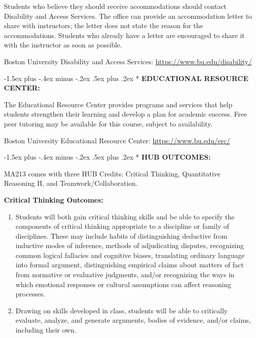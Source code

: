 \documentclass[11pt]{article}
\makeatletter
\renewcommand\section{\@startsection{section}{1}{0pt}%
  {-1.5ex plus -.4ex minus -.2ex}%
  {.5ex plus .2ex}%
  {\normalfont\Large\bfseries}}
\makeatother
\begin{document}
Students who believe they should receive accommodations should contact Disability and Access Services. The office can provide an accommodation letter to share with instructors; the letter does not state the reason for the accommodations. Students who already have a letter are encouraged to share it with the instructor as soon as possible.

Boston University Disability and Access Services: \url{https://www.bu.edu/disability/}

\section*{}
\textbf{EDUCATIONAL RESOURCE CENTER:}

The Educational Resource Center provides programs and services that help students strengthen their learning and develop a plan for academic success. Free peer tutoring may be available for this course, subject to availability.

Boston University Educational Resource Center: \url{https://www.bu.edu/erc/}

\section*{}
\textbf{HUB OUTCOMES:}

MA213 comes with three HUB Credits: Critical Thinking, Quantitative Reasoning II, and Teamwork/Collaboration.

\textbf{Critical Thinking Outcomes:}

\begin{samepage}
\begin{enumerate}
\item[1.] Students will both gain critical thinking skills and be able to specify the components of critical thinking appropriate to a discipline or family of disciplines. These may include habits of distinguishing deductive from inductive modes of inference, methods of adjudicating disputes, recognizing common logical fallacies and cognitive biases, translating ordinary language into formal argument, distinguishing empirical claims about matters of fact from normative or evaluative judgments, and/or recognizing the ways in which emotional responses or cultural assumptions can affect reasoning processes.
\item[2.] Drawing on skills developed in class, students will be able to critically evaluate, analyze, and generate arguments, bodies of evidence, and/or claims, including their own.
\end{enumerate}
\end{samepage}
\end{document}
